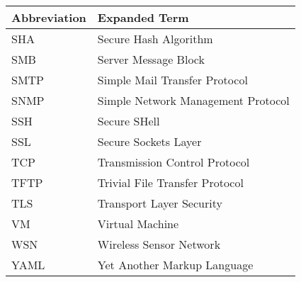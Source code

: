 \begin{tabular}{p{40mm}|p{100mm}}
	\textbf{Abbreviation}&\textbf{Expanded Term}\\
	\hline
    SHA&Secure Hash Algorithm\\
    SMB&Server Message Block\\
    SMTP&Simple Mail Transfer Protocol\\
    SNMP&Simple Network Management Protocol\\
    SSH&Secure SHell\\
    SSL&Secure Sockets Layer\\
    TCP&Transmission Control Protocol\\
    TFTP&Trivial File Transfer Protocol\\
    TLS&Transport Layer Security\\
    VM&Virtual Machine\\
	WSN&Wireless Sensor Network\\
    YAML&Yet Another Markup Language\\
\end{tabular} 
